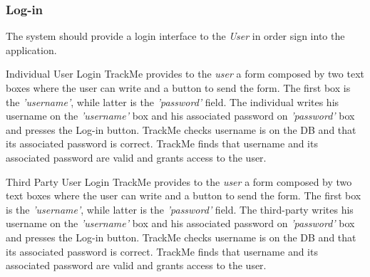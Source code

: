 \documentclass[a4paper]{article}
\begin{document}
        \subsubsection{Log-in}
        The system should provide a login interface to the \textit{User} in order sign into the application.
        
        \begin{usecase}{Individual User Login}
              {TrackMe provides to the \textit{user} a form composed by two text boxes where the user can write and a button to send the form. The first box is the \textit{'username'}, while latter is the \textit{'password'} field.}
              {The individual writes his username on the \textit{'username'} box and his associated password on \textit{'password'} box and presses the Log-in button.}
              {TrackMe checks username is on the DB and that its associated password is correct.}
              {TrackMe finds that username and its associated password are valid and grants access to the user.}
        \end{usecase}
        
        \begin{usecase}{Third Party User Login}
              {TrackMe provides to the \textit{user} a form composed by two text boxes where the user can write and a button to send the form. The first box is the \textit{'username'}, while latter is the \textit{'password'} field.}
              {The third-party writes his username on the \textit{'username'} box and his associated password on \textit{'password'} box and presses the Log-in button.}
              {TrackMe checks username is on the DB and that its associated password is correct.}
              {TrackMe finds that username and its associated password are valid and grants access to the user.}
        \end{usecase}
        
\end{document}
